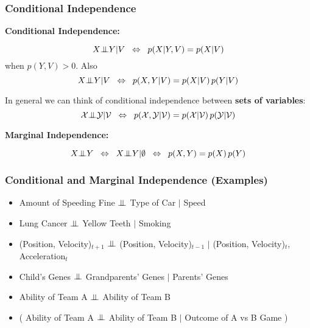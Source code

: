 \begin{frame}
\frametitle{Conditional Independence}

{\bf Conditional Independence:} 

\[
X{\bot\negthickspace\negthickspace\bot} Y|V \;\; \Leftrightarrow \;\; p(X|Y,V)=p(X|V)
\]
 when $p(Y,V)>0$. Also 
\[
X{\bot\negthickspace\negthickspace\bot} Y|V \;\; \Leftrightarrow \;\; p(X,Y|V)=p(X|V) \, p(Y|V)
\] 

In general we can think of conditional independence between {\bf sets
  of variables}:
\[
{\cal X} {\bot\negthickspace\negthickspace\bot} {\cal Y} | {\cal V} \;\; \Leftrightarrow \;\; 
p({\cal X},{\cal Y}|{\cal V})=p({\cal X}|{\cal V}) \, p({\cal Y}|{\cal
  V})
\]

{\bf Marginal Independence:}

\[
X{\bot\negthickspace\negthickspace\bot} Y \;\; \Leftrightarrow \;\; X{\bot\negthickspace\negthickspace\bot} Y|\emptyset \;\; \Leftrightarrow
\;\; p(X,Y)=p(X) \, p(Y)
\]



\end{frame}
\begin{frame}
\frametitle{Conditional and Marginal Independence (Examples)}

\begin{itemize}
\item Amount of Speeding Fine ${\bot\negthickspace\negthickspace\bot}$ Type of Car $|$ Speed 

\item Lung Cancer ${\bot\negthickspace\negthickspace\bot}$ Yellow Teeth $|$ Smoking

\item (Position, Velocity)$_{t+1}$ ${\bot\negthickspace\negthickspace\bot}$ (Position, Velocity)$_{t-1}$ $|$
(Position, Velocity)$_{t}$, Acceleration$_t$

\item Child's Genes ${\bot\negthickspace\negthickspace\bot}$ Grandparents' Genes $|$ Parents' Genes
  

\item Ability of Team A ${\bot\negthickspace\negthickspace\bot}$ Ability of Team B

\item {} ( Ability of Team A ${\bot\negthickspace\negthickspace\bot}$ Ability of Team B $|$ Outcome of A
vs B Game )

\end{itemize}



\end{frame}
